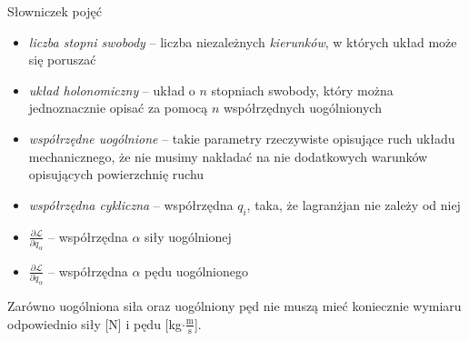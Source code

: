 \documentclass[../main.tex]{subfiles}
\begin{document}
\noindent{}
\medskip

\noindent Słowniczek pojęć
\begin{itemize}
\item \textit{liczba stopni swobody} -- liczba niezależnych \textit{kierunków}, w których układ może
się poruszać
    \item \textit{układ holonomiczny} -- układ o \(n\) stopniach swobody, który można jednoznacznie
    opisać za pomocą \(n\) współrzędnych uogólnionych
    \item \textit{współrzędne uogólnione} -- takie parametry rzeczywiste opisujące ruch układu
    mechanicznego, że nie musimy nakładać na nie dodatkowych warunków opisujących powierzchnię ruchu
    \item \textit{współrzędna cykliczna} -- współrzędna \(q_i\), taka, że lagranżjan nie zależy od
    niej
    \item \(\frac{\partial\mathcal{L}}{\partial q_\alpha}\) -- współrzędna \(\alpha\) siły
    uogólnionej
    \item \(\frac{\partial \mathcal{L}}{\partial \dot{q}_\alpha}\) -- współrzędna \(\alpha\) pędu
    uogólnionego
\end{itemize}
Zarówno uogólniona siła oraz uogólniony pęd nie muszą mieć koniecznie wymiaru odpowiednio siły [N] i
pędu [kg\(\cdot\frac{\text{m}}{\text{s}}\)].
\end{document}
